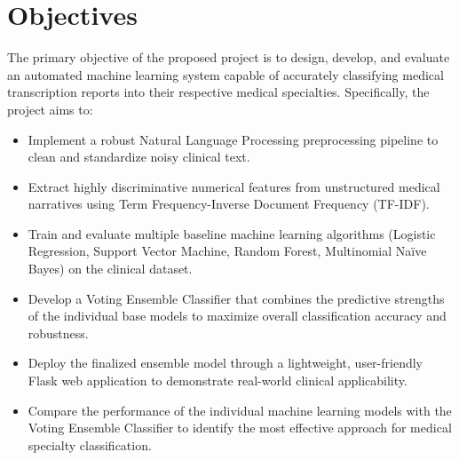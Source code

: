 \chapter{Objectives}
The primary objective of the proposed project is to design, develop, and evaluate an automated machine learning system capable of accurately classifying medical transcription reports into their respective medical specialties. Specifically, the project aims to:
\begin{itemize}
    \item Implement a robust Natural Language Processing preprocessing pipeline to clean and standardize noisy clinical text.
    \item Extract highly discriminative numerical features from unstructured medical narratives using Term Frequency-Inverse Document Frequency (TF-IDF).
    \item Train and evaluate multiple baseline machine learning algorithms (Logistic Regression, Support Vector Machine, Random Forest, Multinomial Naïve Bayes) on the clinical dataset.
    \item Develop a Voting Ensemble Classifier that combines the predictive strengths of the individual base models to maximize overall classification accuracy and robustness.
    \item Deploy the finalized ensemble model through a lightweight, user-friendly Flask web application to demonstrate real-world clinical applicability.
    \item Compare the performance of the individual machine learning models with the Voting Ensemble Classifier to identify the most effective approach for medical specialty classification.
\end{itemize}
